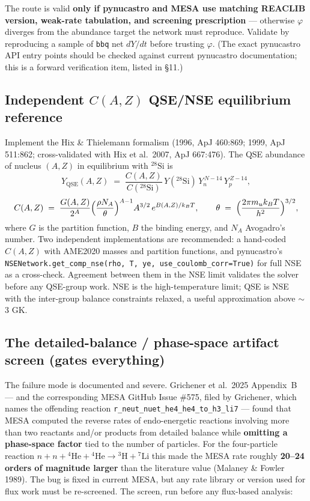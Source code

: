 \documentclass[11pt]{article}
\newcommand{\bbq}{\texttt{bbq}}
\begin{document}
The route is valid \textbf{only if pynucastro and MESA use matching REACLIB version, weak-rate tabulation, and screening prescription} --- otherwise $\varphi$ diverges from the abundance target the network must reproduce. Validate by reproducing a sample of \bbq{} net $dY/dt$ before trusting $\varphi$. (The exact pynucastro API entry points should be checked against current pynucastro documentation; this is a forward verification item, listed in \S11.)

\subsection{Independent \texorpdfstring{$C(A,Z)$}{C(A,Z)} QSE/NSE equilibrium reference}

Implement the Hix \& Thielemann formalism (1996, ApJ 460:869; 1999, ApJ 511:862; cross-validated with Hix et al.\ 2007, ApJ 667:476). The QSE abundance of nucleus $(A,Z)$ in equilibrium with ${}^{28}\mathrm{Si}$ is
\[
Y_{\mathrm{QSE}}(A,Z) \;=\; \frac{C(A,Z)}{C({}^{28}\mathrm{Si})}\, Y({}^{28}\mathrm{Si})\, Y_n^{\,N-14}\, Y_p^{\,Z-14},
\]
\[
C(A,Z) \;=\; \frac{G(A,Z)}{2^{A}}\Bigl(\frac{\rho N_A}{\theta}\Bigr)^{A-1} A^{3/2}\, e^{B(A,Z)/k_B T},
\qquad
\theta \;=\; \Bigl(\frac{2\pi m_u k_B T}{h^{2}}\Bigr)^{3/2},
\]
where $G$ is the partition function, $B$ the binding energy, and $N_A$ Avogadro's number. Two independent implementations are recommended: a hand-coded $C(A,Z)$ with AME2020 masses and partition functions, and pynucastro's \texttt{NSENetwork.get\_comp\_nse(rho, T, ye, use\_coulomb\_corr=True)} for full NSE as a cross-check. Agreement between them in the NSE limit validates the solver before any QSE-group work. NSE is the high-temperature limit; QSE is NSE with the inter-group balance constraints relaxed, a useful approximation above $\sim$3 GK.

\subsection{The detailed-balance / phase-space artifact screen (gates everything)}

The failure mode is documented and severe. Grichener et al.\ 2025 Appendix~B --- and the corresponding MESA GitHub Issue \#575, filed by Grichener, which names the offending reaction \texttt{r\_neut\_nuet\_he4\_he4\_to\_h3\_li7} --- found that MESA computed the reverse rates of endo-energetic reactions involving more than two reactants and/or products from detailed balance while \textbf{omitting a phase-space factor} tied to the number of particles. For the four-particle reaction $n + n + {}^{4}\mathrm{He} + {}^{4}\mathrm{He} \to {}^{3}\mathrm{H} + {}^{7}\mathrm{Li}$ this made the MESA rate roughly \textbf{20--24 orders of magnitude larger} than the literature value (Malaney \& Fowler 1989). The bug is fixed in current MESA, but any rate library or version used for flux work must be re-screened. The screen, run before any flux-based analysis:
\end{document}
